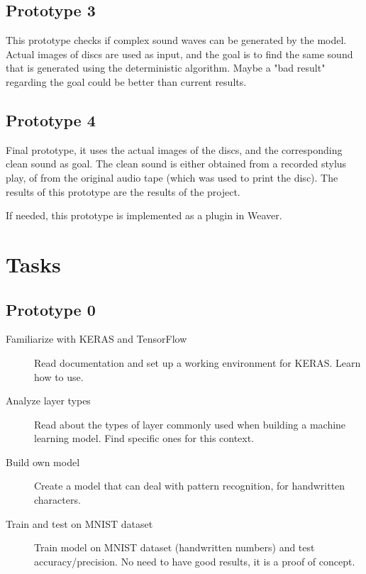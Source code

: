 \documentclass[12pt, twoside]{article}
\begin{document}
\subsection{Prototype 3}
This prototype checks if complex sound waves can be generated by the model. Actual images of discs are used as input, and the goal is to find the same sound that is generated using the deterministic algorithm. Maybe a "bad result" regarding the goal could be better than current results.
\subsection{Prototype 4}
Final prototype, it uses the actual images of the discs, and the corresponding clean sound as goal. The clean sound is either obtained from a recorded stylus play, of from the original audio tape (which was used to print the disc). The results of this prototype are the results of the project.

If needed, this prototype is implemented as a plugin in Weaver.  
\section{Tasks}
\subsection{Prototype 0}
\begin{description}
	\item[Familiarize with KERAS and TensorFlow] Read documentation and set up a working environment for KERAS. Learn how to use.
	 \item[Analyze layer types] Read about the types of layer commonly used when building a machine learning model. Find specific ones for this context.
	 \item[Build own model] Create a model that can deal with pattern recognition, for handwritten characters.
	 \item[Train and test on MNIST dataset] Train model on MNIST dataset (handwritten numbers) and test accuracy/precision. No need to have good results, it is a proof of concept.
\end{description}
\end{document}
